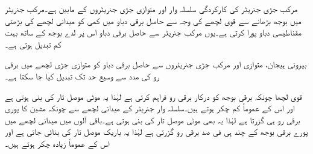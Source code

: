 مرکب جڑی جنریٹر کی کارکردگی سلسلہ وار اور متوازی جڑی جنریٹروں کے مابین ہے۔مرکب جنریٹر میں بوجھ بڑھانے سے قوی لچھے کی وجہ سے حاصل برقی دباو میں کمی کو میدانی لچھے کی بڑھتی مقناطیسی دباو پورا کرتی ہے۔یوں مرکب جنریٹر سے حاصل برقی دباو اس پر لدے بوجھ کے ساتھ بہت کم تبدیل ہوتی ہے۔

بیرونی ہیجان، متوازی اور مرکب جڑی جنریٹروں سے حاصل برقی دباو کو متوازی جڑی لچھے میں برقی رو کی مدد سے وسیع حد تک تبدیل کیا جا سکتا ہے۔

قوی لچھا چونکہ برقی بوجھ کو درکار برقی رو فراہم کرتی ہے لہٰذا یہ موٹی موصل تار کی بنی ہوتی ہے اور اس کے عموماً کم چکر ہوتے ہیں۔سلسلہ وار جنریٹر کے میدانی لچھے سے چونکہ مشین کا پوری برقی رو ہی گزرتا ہے لہٰذا یہ بھی موٹی موصل تار کی بنی ہوتی ہے۔باقی آلوں میں میدانی لچھے میں پورے برقی بوجھ کے چند ہی فی صد برقی رو گزرتی ہے لہٰذا یہ باریک موصل تار کی بنائی جاتی ہے اور اس کے عموماً زیادہ چکر ہوتے ہیں۔

